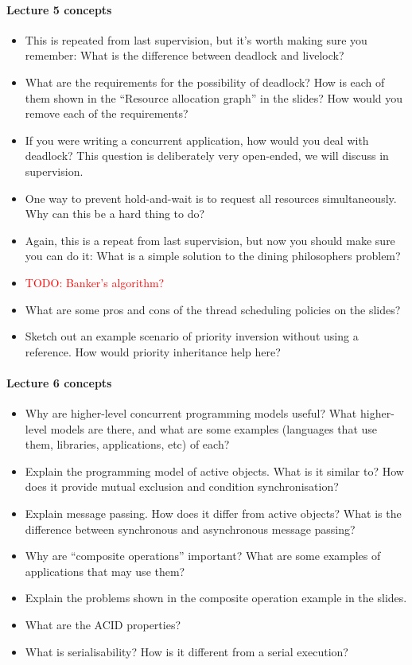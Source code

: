 \documentclass[12pt,a4paper,oneside,openright]{report}
\newcommand{\question}[2]{\paragraph{#1} #2}
\newcommand{\todo}[1]{\textcolor{red}{TODO: #1}}
\begin{document}
\question{Lecture 5 concepts}{
  \begin{itemize}
  \item This is repeated from last supervision, but it's worth making
    sure you remember: What is the difference between deadlock and
    livelock?
  \item What are the requirements for the possibility of deadlock? How
    is each of them shown in the ``Resource allocation graph'' in the
    slides? How would you remove each of the requirements?
  \item If you were writing a concurrent application, how would you
    deal with deadlock? This question is deliberately very open-ended,
    we will discuss in supervision.
  \item One way to prevent hold-and-wait is to request all resources
    simultaneously. Why can this be a hard thing to do?
  \item Again, this is a repeat from last supervision, but now you
    should make sure you can do it: What is a simple solution to the
    dining philosophers problem?
  \item \todo{Banker's algorithm?}
  \item What are some pros and cons of the thread scheduling policies
    on the slides?
  \item Sketch out an example scenario of priority inversion without
    using a reference. How would priority inheritance help here?
  \end{itemize}
}

\question{Lecture 6 concepts}{
  \begin{itemize}
  \item Why are higher-level concurrent programming models useful?
    What higher-level models are there, and what are some examples
    (languages that use them, libraries, applications, etc) of each?
  \item Explain the programming model of active objects. What is it
    similar to? How does it provide mutual exclusion and condition
    synchronisation?
  \item Explain message passing. How does it differ from active
    objects? What is the difference between synchronous and
    asynchronous message passing?
  \item Why are ``composite operations'' important? What are some
    examples of applications that may use them?
  \item Explain the problems shown in the composite operation example
    in the slides.
  \item What are the ACID properties?
  \item What is serialisability? How is it different from a serial
    execution?
  \end{itemize}
}
\end{document}
